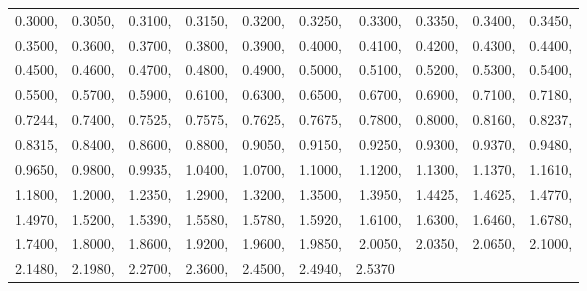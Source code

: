 \begin{table}
\begin{tabular}{|| r r r r r r r r r r ||}
\hline
0.3000, & 0.3050, & 0.3100, & 0.3150, & 0.3200, & 0.3250, & 0.3300, & 0.3350, & 0.3400, & 0.3450, \\ 
0.3500, & 0.3600, & 0.3700, & 0.3800, & 0.3900, & 0.4000, & 0.4100, & 0.4200, & 0.4300, & 0.4400, \\  
0.4500, & 0.4600, & 0.4700, & 0.4800, & 0.4900, & 0.5000, & 0.5100, & 0.5200, & 0.5300, & 0.5400, \\
0.5500, & 0.5700, & 0.5900, & 0.6100, & 0.6300, & 0.6500, & 0.6700, & 0.6900, & 0.7100, & 0.7180, \\
0.7244, & 0.7400, & 0.7525, & 0.7575, & 0.7625, & 0.7675, & 0.7800, & 0.8000, & 0.8160, & 0.8237, \\
0.8315, & 0.8400, & 0.8600, & 0.8800, & 0.9050, & 0.9150, & 0.9250, & 0.9300, & 0.9370, & 0.9480, \\
0.9650, & 0.9800, & 0.9935, & 1.0400, & 1.0700, & 1.1000, & 1.1200, & 1.1300, & 1.1370, & 1.1610, \\
1.1800, & 1.2000, & 1.2350, & 1.2900, & 1.3200, & 1.3500, & 1.3950, & 1.4425, & 1.4625, & 1.4770, \\
1.4970, & 1.5200, & 1.5390, & 1.5580, & 1.5780, & 1.5920, & 1.6100, & 1.6300, & 1.6460, & 1.6780, \\
1.7400, & 1.8000, & 1.8600, & 1.9200, & 1.9600, & 1.9850, & 2.0050, & 2.0350, & 2.0650, & 2.1000, \\
2.1480, & 2.1980, & 2.2700, & 2.3600, & 2.4500, & 2.4940, & 2.5370~ & & & \\
\hline\hline
\end{tabular}
\label{table:solar-spectral-irradiance-function.}
\end{table}

